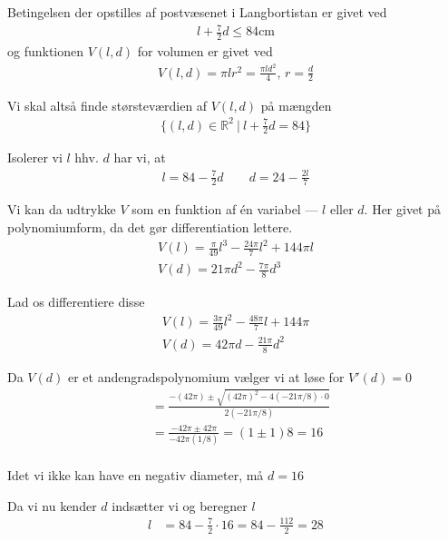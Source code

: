 \documentclass[11pt,a4paper]{article}
\begin{document}
\begin{multicols}{2}
    Betingelsen der opstilles af postvæsenet i Langbortistan er givet ved
    \begin{align}
        l + \frac{7}{2}d \leq 84\text{cm}
    \end{align}
    og funktionen $V(l,d)$ for volumen er givet ved
    \begin{align}
        V(l,d) = \pi l r^2 = \frac{\pi l d^2}{4}\text{, }r=\frac{d}{2}
    \end{align}

    Vi skal altså finde størsteværdien af $V(l,d)$ på mængden
    \begin{align}
        \{ (l,d) \in \mathbb{R}^2{\ }|{\ } l + \frac{7}{2}d = 84 \}
    \end{align}

    Isolerer vi $l$ hhv. $d$ har vi, at
    \begin{align}
        l = 84 - \frac{7}{2}d
        \qquad
        d = 24 - \frac{2l}{7}
    \end{align}

    Vi kan da udtrykke $V$ som en funktion af én variabel --- $l$ eller $d$.
    Her givet på polynomiumform, da det gør differentiation lettere.
    \begin{align}
        V(l) = \frac{\pi}{49} l^3 - \frac{24 \pi}{7} l^2 + 144 \pi l \\
        V(d) = 21 \pi d^2 - \frac{7 \pi}{8} d^3
    \end{align}

    Lad os differentiere disse
    \begin{align}
        V(l) = \frac{3 \pi}{49} l^2 - \frac{48 \pi}{7} l + 144 \pi \\
        V(d) = 42 \pi d - \frac{21 \pi}{8} d^2
    \end{align}

    Da $V(d)$ er et andengradspolynomium vælger vi at løse for $V'(d) = 0$
    \begin{align}
        &=\frac{-(42\pi) \pm \sqrt{(42\pi)^2 - 4 (-21\pi/8) \cdot 0}}{2 (-21\pi/8)} \\
        &= \frac{-42\pi \pm 42\pi}{-42\pi(1/8)} = (1 \pm 1)8 = 16\\
    \end{align}

    Idet vi ikke kan have en negativ diameter, må $d = 16$

    Da vi nu kender $d$ indsætter vi og beregner $l$
    \begin{align}
        l &= 84 - \frac{7}{2} \cdot 16
           = 84 - \frac{112}{2}
           = 28
    \end{align}


\end{multicols}
\end{document}
